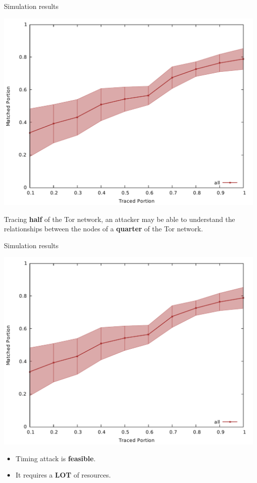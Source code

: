 \begin{frame}{Simulation results}
	\begin{minipage}{.45\textwidth}
		\includegraphics[scale=0.27]{imgs/cs_tport_mport.pdf}
	\end{minipage}
	\begin{minipage}{.45\textwidth}
		Tracing \textbf{half} of the Tor network, an attacker may be able to
understand the relationships between the nodes of a \textbf{quarter} of the Tor
network.
	\end{minipage}
\end{frame}

\begin{frame}{Simulation results}
	\begin{minipage}{.45\textwidth}
		\includegraphics[scale=0.27]{imgs/cs_tport_mport.pdf}
	\end{minipage}
	\begin{minipage}{.45\textwidth}
		\begin{itemize}
			\item Timing attack is \textbf{feasible}.
			\item It requires a \textbf{LOT} of resources.
		\end{itemize}
	\end{minipage}
\end{frame}

